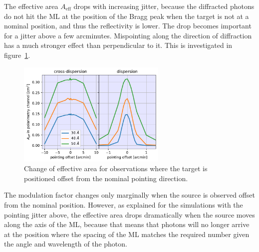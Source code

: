 \documentclass[]{spie}  %
\begin{document}
The effective area $A_{\mathrm{eff}}$ drops with increasing jitter,
because the diffracted photons do not hit the ML at the position of
the Bragg peak when the target is not at a nominal position, and thus
the reflectivity is lower. The drop becomes important for a jitter
above a few arcminutes. Mispointing along the direction of diffraction
has a much stronger effect than perpendicular to it. This is
investigated in figure~\ref{fig:offset_point}.

\begin{figure} [ht]
  \begin{center}
    \includegraphics[height=5cm]{offset_point.pdf}
  \end{center}
  \caption
      { \label{fig:offset_point}Change of effective area for observations where the target is positioned offset from the nominal pointing direction. 
}
\end{figure}

The modulation factor changes only marginally when the source is
observed offset from the nominal position. However, as explained for
the simulations with the pointing jitter above, the effective area
drops dramatically when the source moves along the axis of the ML,
because that means that photons will no longer arrive at the position
where the spacing of the ML matches the required number given the
angle and wavelength of the photon.
\end{document}
